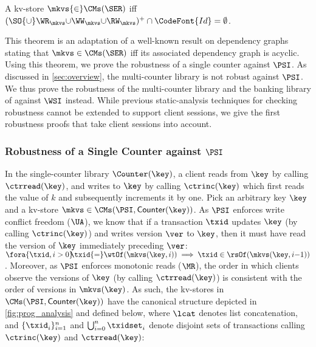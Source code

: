\begin{theorem}
\label{thm:serialisable_nocycle}
A kv-store $\mkvs {\in} \CMs(\SER)$ iff $(\SO {\cup} \WR_{\mkvs} 
{\cup} \WW_{\mkvs} {\cup} \RW_{\mkvs})^{+} \cap \CodeFont{Id} = \emptyset$.%
\end{theorem}
This theorem is an adaptation of a well-known result on
dependency graphs~\cite{adya} stating that $\mkvs \in \CMs(\SER)$ iff its associated dependency graph is acyclic. 
Using this theorem, we prove the robustness of a single counter against $\PSI$.
As discussed in \cref{sec:overview}, the multi-counter library is not robust against $\PSI$. 
We thus prove the robustness of the multi-counter library and the banking library of \citet{bank-example-wsi} against $\WSI$ instead. 
While previous static-analysis techniques for checking robustness \citep{giovanni_concur16,SIanalysis,laws,sureshConcur}
cannot be extended to support client sessions, 
we give the first robustness proofs that take client sessions into account.



\subsubsection{Robustness of a Single Counter against $\PSI$}
In the single-counter library $\Counter(\key)$, 
a client reads from $\key$ by calling $\ctrread(\key)$, and writes to $\key$ by calling $\ctrinc(\key)$ which first reads the value of $k$ and subsequently increments it by one.
Pick an arbitrary key $\key$ and a kv-store $\mkvs \in \CMs(\PSI, \mathsf{Counter}(\key))$.
As $\PSI$ enforces write conflict freedom (\(\UA\)), we know that if a transaction $\txid$ updates $\key$ (by calling $\ctrinc(\key)$) and writes version $\ver$ to $\key$, then it must have read the version of $\key$ immediately preceding $\ver$:
$\fora{\txid, i > 0}\!\! \txid {=} \wtOf(\mkvs(\key, i)) \implies \txid \in \rsOf(\mkvs(\key, i{-}1))$. 
Moreover, as $\PSI$ enforces monotonic reads ($\MR$),
the order in which clients observe the versions of $\key$ (by calling $\ctrread(\key)$)
is consistent with the order of versions in $\mkvs(\key)$. 
As such, the kv-stores in $\CMs(\PSI, \mathsf{Counter}(\key))$ have the canonical structure depicted in  \cref{fig:prog_analysis} and defined below, where $\lcat$ denotes list concatenation, and 
$\{\txid^{\mathsf{}}_{i}\}_{i=1}^{n}$ and $\bigcup_{i=0}^{n} \txidset^{\mathsf{}}_{i}$ 
denote disjoint sets of transactions calling $\ctrinc(\key)$ and $\ctrread(\key)$: 

